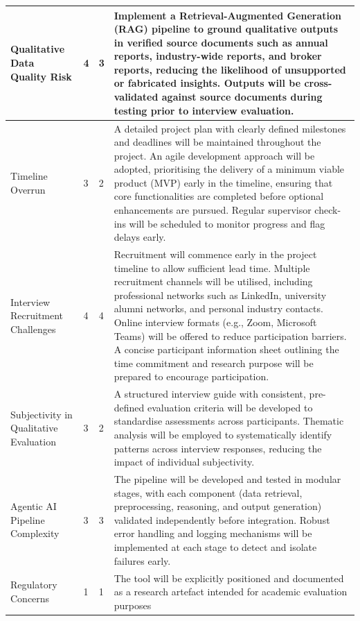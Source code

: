\begin{longtable}{|p{3.5cm}|p{0.5cm}|p{0.5cm}|p{10cm}|}
    Qualitative Data Quality Risk & 4 & 3 &
    Implement a Retrieval-Augmented Generation (RAG) pipeline to
    ground qualitative outputs in verified source documents such
    as annual reports, industry-wide reports, and broker reports,
    reducing the likelihood of unsupported or fabricated insights.
    Outputs will be cross-validated against source documents
    during testing prior to interview evaluation. \\
    \hline
    Timeline Overrun & 3 & 2 &
    A detailed project plan with clearly defined milestones and
    deadlines will be maintained throughout the project. An agile
    development approach will be adopted, prioritising the delivery
    of a minimum viable product (MVP) early in the timeline,
    ensuring that core functionalities are completed before optional
    enhancements are pursued. Regular supervisor check-ins will be
    scheduled to monitor progress and flag delays early. \\
    \hline
    Interview Recruitment Challenges & 4 & 4 &
    Recruitment will commence early in the project timeline to
    allow sufficient lead time. Multiple recruitment channels will
    be utilised, including professional networks such as LinkedIn,
    university alumni networks, and personal industry contacts.
    Online interview formats (e.g., Zoom, Microsoft Teams) will
    be offered to reduce participation barriers. A concise
    participant information sheet outlining the time commitment
    and research purpose will be prepared to encourage
    participation. \\
    \hline
    Subjectivity in Qualitative Evaluation & 3 & 2 &
    A structured interview guide with consistent, pre-defined
    evaluation criteria will be developed to standardise
    assessments across participants. Thematic analysis will be
    employed to systematically identify patterns across interview
    responses, reducing the impact of individual subjectivity. \\
    \hline
    Agentic AI Pipeline Complexity & 3 & 3 &
    The pipeline will be developed and tested in modular stages,
    with each component (data retrieval, preprocessing, reasoning,
    and output generation) validated independently before
    integration. Robust error handling and logging mechanisms
    will be implemented at each stage to detect and isolate
    failures early. \\
    \hline
    Regulatory Concerns & 1 & 1 &
    The tool will be explicitly positioned and documented as a
    research artefact intended for academic evaluation purposes

\end{longtable}
